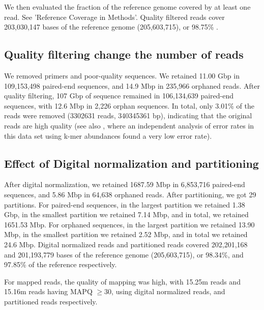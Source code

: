 We then evaluated the fraction of the reference genome covered by at
least one read. See 'Reference Coverage in Methods'. %
Quality filtered reads cover 203,030,147 bases of the reference genome
(205,603,715), or 98.75\% .


\subsection*{Quality filtering change the number of reads}            

We removed primers and poor-quality
sequences.  We retained 11.00 Gbp in 109,153,498
paired-end sequences, and 14.9 Mbp in 235,966 orphaned reads.  After
quality filtering, 107 Gbp of sequence remained in 106,134,639
paired-end sequences, with 12.6 Mbp in 2,226 orphan sequences.  In
total, only 3.01\% of the reads were removed (3302631 reads, 340345361 bp),
indicating that the original reads are high quality (see also  \cite{streaming}, where an independent analysis of error rates
in this data set using k-mer abundances found a very low error rate).

\subsection *{Effect of Digital normalization and partitioning} 

After digital normalization, we retained 
1687.59 Mbp in 6,853,716 paired-end sequences, and 5.86 Mbp in 64,638 orphaned reads. 
 After partitioning, we
got 29 partitions.  For paired-end sequences, in the largest partition we retained %
1.38 Gbp, in the smallest partition we retained 7.14 Mbp, and in total,  we retained 1651.53
Mbp.  For orphaned sequences, in the largest partition we retained 13.90
Mbp, in the smallest partition we retained 2.52 Mbp, and in total we retained 24.6 Mbp.  
Digital normalized reads and partitioned reads covered 
202,201,168 and 201,193,779  bases of the reference genome (205,603,715), or 98.34\%, and 97.85\% of the reference respectively.

For mapped reads, the quality of mapping was high, with 15.25m reads  and 15.16m reads having MAPQ $\geq 30$, using digital
normalized reads, and partitioned reads respectively.

